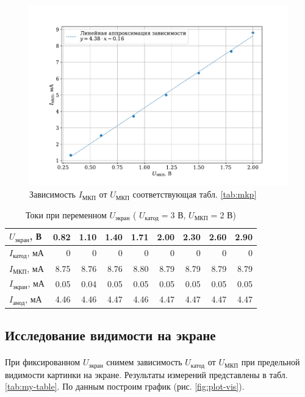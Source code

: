 \documentclass[a4paper,12pt]{article} %
\begin{document}
\begin{figure}
\centering
\includegraphics[width=\textwidth]{plot2.pdf}
\caption{Зависимость $I_\text{МКП}$ от $U_\text{МКП}$ соответствующая табл. \ref{tab:mkp}}
\end{figure}

\begin{table}[h]
\centering
\begin{tabular}{|l|r|r|r|r|r|r|r|r|}
\hline
$U_\text{экран}$, В  & 0.82 & 1.10 & 1.40 & 1.71 & 2.00 & 2.30 & 2.60 & 2.90 \\ \hline
$I_\text{катод}$, мА & 0    & 0    & 0    & 0    & 0    & 0    & 0    & 0    \\ \hline
$I_\text{МКП}$, мА   & 8.75 & 8.76 & 8.76 & 8.80 & 8.79 & 8.79 & 8.79 & 8.79 \\ \hline
$I_\text{экран}$, мА & 0.05 & 0.04 & 0.05 & 0.05 & 0.05 & 0.05 & 0.05 & 0.05 \\ \hline
$I_\text{анод}$, мА  & 4.46 & 4.46 & 4.47 & 4.46 & 4.47 & 4.47 & 4.47 & 4.47 \\ \hline
\end{tabular}
\caption{Токи при переменном $U_\text{экран} $ ( $U_\text{катод} = 3$ В, $U_\text{МКП} = 2$ В)}
\label{tab:ekr}
\end{table}

\subsection{Исследование видимости на экране}

\paragraph{} При фиксированном $U_\text{экран}$ снимем зависимость $U_\text{катод}$ от $U_\text{МКП}$ при предельной видимости картинки на экране. Результаты измерений представлены в табл. \ref{tab:my-table}. По данным построим график (рис. \ref{fig:plot-vis}).
\end{document}
